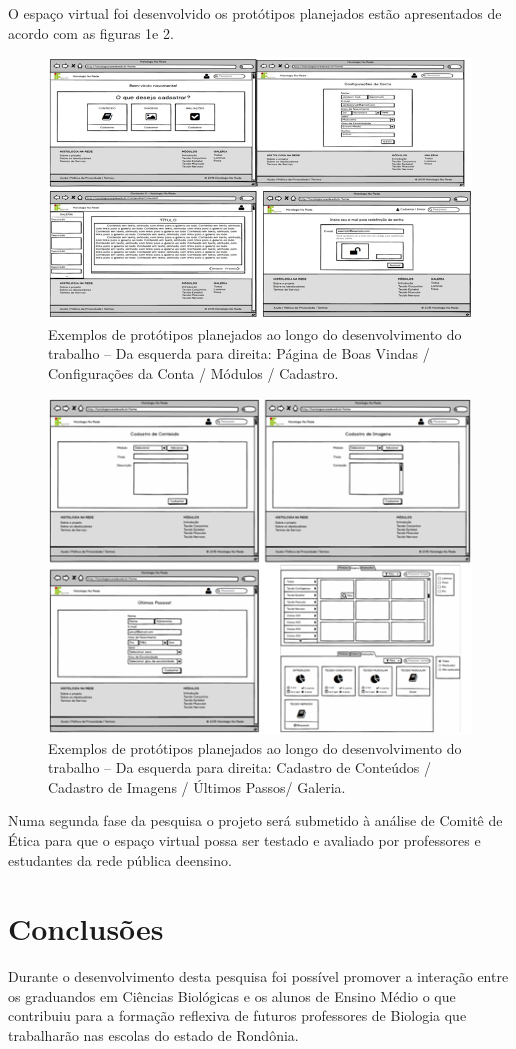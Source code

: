 \documentclass[article,12pt,onesidea,4paper,english,brazil]{abntex2}
\begin{document}
O espaço virtual foi desenvolvido os protótipos planejados estão apresentados de acordo com as figuras 1e 2.

\begin{figure}[h]
	\centering
	\includegraphics[width=0.6\linewidth]{pip-artigo12-01}
	\caption{Exemplos de protótipos planejados ao longo do desenvolvimento do trabalho – Da esquerda para direita: Página de Boas Vindas / Configurações da Conta / Módulos / Cadastro.}
	\label{fig:pip-artigo12-01}
\end{figure}
\begin{figure}[h]
	\centering
	\includegraphics[width=0.6\linewidth]{pip-artigo12-02}
	\caption{Exemplos de protótipos planejados ao longo do desenvolvimento do trabalho – Da esquerda para direita: Cadastro de Conteúdos / Cadastro de Imagens / Últimos Passos/ Galeria.}
	\label{fig:pip-artigo12-02}
\end{figure}

Numa segunda fase da pesquisa o projeto será submetido à análise de Comitê de Ética para que o espaço virtual possa ser testado e avaliado por professores e estudantes da rede pública deensino.

	
	\section*{Conclusões}
	
Durante o desenvolvimento desta pesquisa foi possível promover a interação entre os graduandos em Ciências Biológicas e os alunos de Ensino Médio o que contribuiu para a formação reflexiva de futuros professores de Biologia que trabalharão nas escolas do estado de Rondônia.
\end{document}
